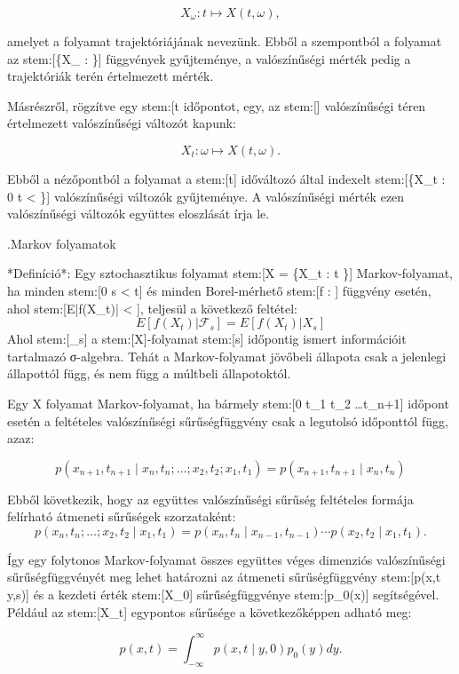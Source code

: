 \documentclass[11pt]{article}
\begin{document}
\[
X_{\omega} : t \mapsto X(t, \omega),
\]

amelyet a folyamat trajektóriájának nevezünk. Ebből a szempontból a folyamat az stem:[\{X_{\omega} : \omega \in \Omega\}] függvények gyűjteménye, a valószínűségi mérték pedig a trajektóriák terén értelmezett mérték.

Másrészről, rögzítve egy stem:[t \in [0, \infty)] időpontot, egy, az stem:[\Omega] valószínűségi téren értelmezett valószínűségi változót kapunk:

\[
X_t : \omega \mapsto X(t, \omega).
\]

Ebből a nézőpontból a folyamat a stem:[t] időváltozó által indexelt stem:[\{X_t : 0 \le t < \infty\}] valószínűségi változók gyűjteménye.
A valószínűségi mérték ezen valószínűségi változók együttes eloszlását  írja le.

.Markov folyamatok

*Definíció*: Egy sztochasztikus folyamat stem:[X = \{X_t : t \}] Markov-folyamat, ha minden stem:[0 \le s < t] és minden Borel-mérhető stem:[f :  \to {}] függvény esetén, ahol stem:[E|f(X_t)| < \infty], teljesül a következő feltétel:
\[E[f(X_t) | \mathcal{F}_s] = E[f(X_t) | X_s]\]
Ahol stem:[_s] a stem:[X]-folyamat stem:[s] időpontig ismert információit tartalmazó σ-algebra.
Tehát a Markov-folyamat jövőbeli állapota csak a jelenlegi állapottól függ, és nem függ a múltbeli állapotoktól.

Egy X folyamat Markov-folyamat, ha bármely stem:[0 \le t_1 \lt t_2 \lt \dots \lt t_{n+1}] időpont esetén a feltételes valószínűségi sűrűségfüggvény csak a legutolsó időponttól függ, azaz:

\[
p(x_{n+1}, t_{n+1} \mid x_n, t_n; \dots; x_2, t_2; x_1, t_1) = p(x_{n+1}, t_{n+1} \mid x_n, t_n)
\]

Ebből következik, hogy az együttes valószínűségi sűrűség feltételes formája felírható átmeneti sűrűségek szorzataként:
\[
p(x_n, t_n; \dots; x_2, t_2 \mid x_1, t_1) = p(x_n, t_n \mid x_{n-1}, t_{n-1}) \cdots p(x_2, t_2 \mid x_1, t_1).
\]

Így egy folytonos Markov-folyamat összes együttes véges dimenziós valószínűségi sűrűségfüggvényét meg lehet határozni az átmeneti sűrűségfüggvény stem:[p(x,t \mid y,s)] és a kezdeti érték stem:[X_0] sűrűségfüggvénye stem:[p_0(x)] segítségével.
Például az stem:[X_t] egypontos sűrűsége a következőképpen adható meg:

\[
p(x,t) = \int_{-\infty}^{\infty} p(x,t \mid y,0) p_0(y) dy.
\]
\end{document}
